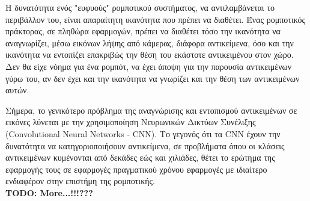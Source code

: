 Η δυνατότητα ενός "ευφυούς" ρομποτικού συστήματος, να αντιλαμβάνεται
το περιβάλλον του, είναι απαραίτητη ικανότητα που πρέπει να διαθέτει.
Ένας ρομποτικός πράκτορας, σε πληθώρα εφαρμογών, πρέπει να διαθέτει τόσο την
ικανότητα να αναγνωρίζει, μέσω εικόνων λήψης από κάμερας, διάφορα αντικείμενα,
όσο και την ικανότητα να εντοπίζει επακριβώς την θέση του
εκάστοτε αντικειμένου στον χώρο. Δεν θα είχε νόημα για ένα ρομπότ, να έχει άποψη
για την παρουσία αντικειμένων γύρω του, αν δεν έχει και την ικανότητα να γνωρίζει
και την θέση των αντικειμένων αυτών.

Σήμερα, το γενικότερο πρόβλημα της αναγνώρισης και εντοπισμού αντικειμένων σε εικόνες
λύνεται με την χρησιμοποίηση Νευρωνικών Δικτύων Συνέλιξης (Convolutional Neural Networks - CNN).
Το γεγονός ότι τα CNN έχουν την δυνατότητα να κατηγοριοποιήσουν αντικείμενα,
σε προβλήματα όπου οι κλάσεις αντικειμένων κυμένονται από δεκάδες εώς και χιλιάδες,
θέτει το ερώτημα της εφαρμογής τους σε εφαρμογές πραγματικού χρόνου εφαρμογές
με ιδιαίτερο ενδιαφέρον στην επιστήμη της ρομποτικής.
\\

\textbf{TODO: More...!!!???}




